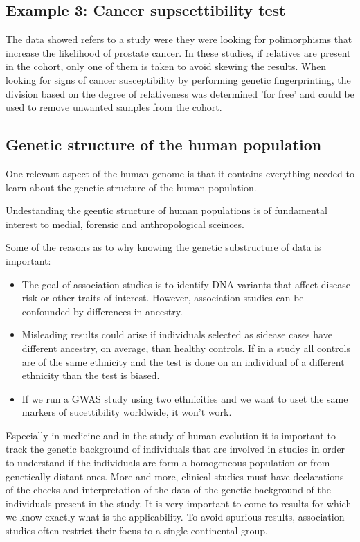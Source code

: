 \subsection*{Example 3: Cancer supscettibility test}
The data showed refers to a study were they were looking for polimorphisms that increase the likelihood of prostate cancer. In these studies, if relatives are present in the cohort, only one of them is taken to avoid skewing the results. 
When looking for signs of cancer susceptibility by performing genetic fingerprinting, the division based on the degree of relativeness was determined 'for free' and could be used to remove unwanted samples from the cohort.


\subsection*{Genetic structure of the human population}

One relevant aspect of the human genome is that it contains everything needed to learn about the genetic structure of the human population. 

Undestanding the geentic structure of human populations is of fundamental interest to medial, forensic and anthropological sceinces. 

Some of the reasons as to why knowing the genetic substructure of data is important:
\begin{itemize}
	\item The goal of association studies is to identify DNA variants that affect disease risk or other traits of interest. However, association studies can be confounded by differences in ancestry.
	\item Misleading results could arise if individuals selected as sidease cases have different ancestry, on average, than healthy controls. If in a study all controls are of the same ethnicity and the test is done on an individual of a different ethnicity than the test is biased.
 	\item If we run a GWAS study using two ethnicities and we want to uset the same markers of sucettibility worldwide, it won't work. 
\end{itemize}

Especially in medicine and in the study of human evolution it is important to track the genetic background of individuals that are involved in studies in order to understand if the individuals are form a homogeneous population or from genetically distant ones. 
More and more, clinical studies must have declarations of the checks and interpretation of the data of the genetic background of the individuals present in the study. It is very important to come to results for which we know exactly what is the applicability. To avoid spurious results, association studies often restrict their focus to a single continental group. 

